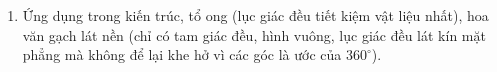 \begin{enumerate}
\item Ứng dụng trong kiến trúc, tổ ong (lục giác đều tiết kiệm vật liệu nhất), hoa văn gạch lát nền (chỉ có tam giác đều, hình vuông, lục giác đều lát kín mặt phẳng mà không để lại khe hở vì các góc là ước của $360^\circ$).
\end{enumerate}
